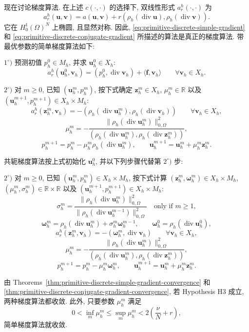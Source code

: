现在讨论梯度算法. 在上述 $c(\cdot,\cdot)$ 的选择下,
双线性形式 $a_r^h(\cdot,\cdot)$ 为
\[
a_r^h(\mathbf u,\mathbf v)
=a(\mathbf u,\mathbf v)
+r(\rho_h(\operatorname{div}\mathbf u),
\rho_h(\operatorname{div}\mathbf v)).
\]
它在 $H_0^1(\Omega)^N$ 上椭圆, 且显然对称. 因此,
\eqref{eq:primitive-discrete-simple-gradient} 和
\eqref{eq:primitive-discrete-conjugate-gradient} 所描述的算法是真正的梯度算法.
带最优参数的简单梯度算法如下:

$1^\circ)$ 预测初值 $p_h^0\in M_h$, 并求 $\mathbf u_h^0\in X_h$:
\[
a_r^h(\mathbf u_h^0,\mathbf v_h)
=(p_h^0,\operatorname{div}\mathbf v_h)
+\langle\mathbf f,\mathbf v_h\rangle
\qquad\forall\mathbf v_h\in X_h.
\]

$2^\circ)$ 对 $m\geq0$, 已知 $(\mathbf u_h^m,p_h^m)$, 按下式确定
$\mathbf z_h^m\in X_h$, $\mu_h^m\in\mathbb R$ 以及
$(\mathbf u_h^{m+1},p_h^{m+1})\in X_h\times M_h$:
\[
a_r^h(\mathbf z_h^m,\mathbf v_h)
=-(\rho_h(\operatorname{div}\mathbf u_h^m),
\rho_h(\operatorname{div}\mathbf v_h))
\qquad\forall\mathbf v_h\in X_h,
\]
\[
\mu_h^m=-\frac{\|\rho_h(\operatorname{div}\mathbf u_h^m)\|_{0,\Omega}^2}
{(\rho_h(\operatorname{div}\mathbf u_h^m),
\rho_h(\operatorname{div}\mathbf z_h^m))},
\]
\[
p_h^{m+1}=p_h^m-\mu_h^m\rho_h(\operatorname{div}\mathbf u_h^m),
\qquad
\mathbf u_h^{m+1}=\mathbf u_h^m+\mu_h^m\mathbf z_h^m.
\]

共轭梯度算法按上式初始化 $\mathbf u_h^0$, 并以下列步骤代替第 $2^\circ)$ 步:

$2^\circ)$ 对 $m\geq0$, 已知 $(\mathbf u_h^m,p_h^m)\in X_h\times M_h$,
按下式计算 $(\mathbf z_h^m,\boldsymbol\omega_h^m)\in X_h\times M_h$,
$(\mu_h^m,\sigma_h^m)\in\mathbb R\times\mathbb R$ 以及
$(\mathbf u_h^{m+1},p_h^{m+1})\in X_h\times M_h$:
\[
\sigma_h^m=
\frac{\|\rho_h(\operatorname{div}\mathbf u_h^m)\|_{0,\Omega}^2}
{\|\rho_h(\operatorname{div}\mathbf u_h^{m-1})\|_{0,\Omega}^2}
\quad\text{only if $m\geq1$},
\]
\[
\boldsymbol\omega_h^m
=\rho_h(\operatorname{div}\mathbf u_h^m)
+\sigma_h^m\boldsymbol\omega_h^{m-1},
\qquad
\boldsymbol\omega_h^0=\rho_h(\operatorname{div}\mathbf u_h^0),
\]
\[
a_r^h(\mathbf z_h^m,\mathbf v_h)
=-(\boldsymbol\omega_h^m,\operatorname{div}\mathbf v_h)
\qquad\forall\mathbf v_h\in X_h,
\]
\[
\mu_h^m=-\frac{\|\rho_h(\operatorname{div}\mathbf u_h^m)\|_{0,\Omega}^2}
{(\rho_h(\operatorname{div}\mathbf u_h^m),
\rho_h(\operatorname{div}\mathbf z_h^m))},
\]
\[
p_h^{m+1}=p_h^m-\mu_h^m\boldsymbol\omega_h^m,
\qquad
\mathbf u_h^{m+1}=\mathbf u_h^m+\mu_h^m\mathbf z_h^m.
\]

由 Theorems~\ref{thm:primitive-discrete-simple-gradient-convergence}
和 \ref{thm:primitive-discrete-conjugate-gradient-convergence},
若 Hypothesis H3 成立, 两种梯度算法都收敛. 此外, 只要参数 $\mu_h^m$ 满足
\[
0<\inf_m\mu_h^m\leq\sup_m\mu_h^m
<2\left(\frac{\nu}{N}+r\right),
\]
简单梯度算法就收敛.

